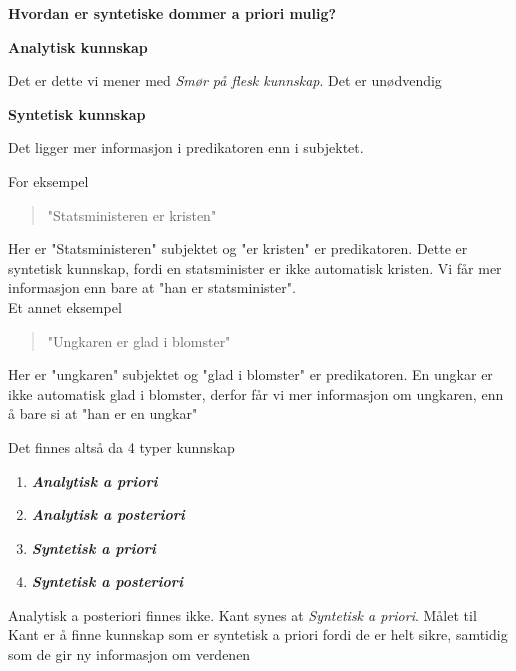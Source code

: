 \documentclass[11pt, a4paper]{article}
\newenvironment{sectionbox}[1][]{%
    \begin{sectionboxinner}
    \textbf{\large #1}
    \vspace{1pt}
    \newline
}{%
    \end{sectionboxinner}
}
\newenvironment{subsectionbox}[1][]{%
    \begin{subsectionboxinner}
    \textbf{#1}
    \vspace{3pt}
    \newline
}{%
    \end{subsectionboxinner}
}
\begin{document}
\begin{sectionbox}[Hvordan er syntetiske dommer a priori mulig?]
\begin{subsectionbox}[Analytisk kunnskap]
Det er dette vi mener med \textit{Smør på flesk kunnskap}. Det er unødvendig
\end{subsectionbox}


\begin{subsectionbox}[Syntetisk kunnskap]

Det ligger mer informasjon i predikatoren enn i subjektet. 

For eksempel
\begin{quote}
    "Statsministeren er kristen"
\end{quote}
Her er "Statsministeren" subjektet og "er kristen" er predikatoren. Dette er syntetisk kunnskap, fordi en statsminister er ikke automatisk kristen. Vi får mer informasjon enn bare at "han er statsminister".\\

Et annet eksempel
\begin{quote}
    "Ungkaren er glad i blomster"
\end{quote}
Her er "ungkaren" subjektet og "glad i blomster" er predikatoren. En ungkar er ikke automatisk glad i blomster, derfor får vi mer informasjon om ungkaren, enn å bare si at "han er en ungkar"
\end{subsectionbox}


Det finnes altså da 4 typer kunnskap
\begin{enumerate}
    \item \textbf{\textit{Analytisk a priori}}
    \item \textbf{\textit{Analytisk a posteriori}}
    \item \textbf{\textit{Syntetisk a priori}}
    \item \textbf{\textit{Syntetisk a posteriori}}
\end{enumerate}

Analytisk a posteriori finnes ikke. Kant synes at \textit{Syntetisk a priori}. Målet til Kant er å finne kunnskap som er syntetisk a priori fordi de er helt sikre, samtidig som de gir ny informasjon om verdenen
\end{sectionbox}
\end{document}
